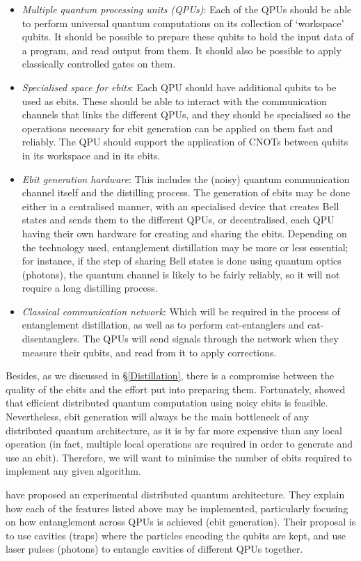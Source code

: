 \begin{itemize}
  \item \textit{Multiple quantum processing units (QPUs)}: Each of the QPUs should be able to perform universal quantum computations on its collection of `workspace' qubits. It should be possible to prepare these qubits to hold the input data of a program, and read output from them. It should also be possible to apply classically controlled gates on them.

  \item \textit{Specialised space for ebits}: Each QPU should have additional qubits to be used as ebits. These should be able to interact with the communication channels that links the different QPUs, and they should be specialised so the operations necessary for ebit generation can be applied on them fast and reliably. The QPU should support the application of CNOTs between qubits in its workspace and in its ebits.
  
  \item \textit{Ebit generation hardware}: This includes the (noisy) quantum communication channel itself and the distilling process. The generation of ebits may be done either in a centralised manner, with an specialised device that creates Bell states and sends them to the different QPUs, or decentralised, each QPU having their own hardware for creating and sharing the ebits. Depending on the technology used, entanglement distillation may be more or less essential; for instance, if the step of sharing Bell states is done using quantum optics (photons), the quantum channel is likely to be fairly reliably, so it will not require a long distilling process.
  
  \item \textit{Classical communication network}: Which will be required in the process of entanglement distillation, as well as to perform cat-entanglers and cat-disentanglers. The QPUs will send signals through the network when they measure their qubits, and read from it to apply corrections. 
\end{itemize}

Besides, as we discussed in \S\ref{Distillation}, there is a compromise between the quality of the ebits and the effort put into preparing them. Fortunately, \citet{NoisyChannels} showed that efficient distributed quantum computation using noisy ebits is feasible. Nevertheless, ebit generation will always be the main bottleneck of any distributed quantum architecture, as it is by far more expensive than any local operation (in fact, multiple local operations are required in order to generate and use an ebit). Therefore, we will want to minimise the number of ebits required to implement any given algorithm.

\citet{DistributedQCHW} have proposed an experimental distributed quantum architecture. They explain how each of the features listed above may be implemented, particularly focusing on how entanglement across QPUs is achieved (ebit generation). Their proposal is to use cavities (traps) where the particles encoding the qubits are kept, and use laser pulses (photons) to entangle cavities of different QPUs together.